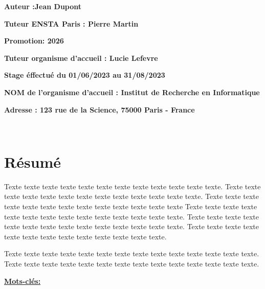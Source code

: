 \documentclass[UTF8,a4paper,12pt]{ctexart}
\def\authorName{Jean Dupont} %
\def\schoolTutor{Pierre Martin} %
\def\classPromotion{2026} %
\def\hostTutor{Lucie Lefevre} %
\def\internshipDuration{Stage éffectué du 01/06/2023 au 31/08/2023} %
\def\hostName{Institut de Recherche en Informatique} %
\def\hostAddress{123 rue de la Science, 75000 Paris - France} %
\begin{document}
\begin{multicols}{2}
    \textbf{\small Auteur :\authorName}\par
    \textbf{\small Tuteur ENSTA Paris : \schoolTutor}\par
    \columnbreak
    \textbf{\small Promotion: \classPromotion}\par
    \textbf{\small Tuteur organisme d'accueil : \hostTutor}\par
\end{multicols}
\par\vspace{1cm}
\textbf{\large\internshipDuration}\par\vspace{1cm}
{\raggedleft
    \textbf{NOM de l'organisme d'accueil : \hostName}\par
    \textbf{Adresse : \hostAddress}\par
}
    
\vspace*{\fill} %

\newpage %
~\newpage
\raggedright
\section*{Résumé}

\hspace{8mm} Texte texte texte texte texte texte texte texte texte texte texte texte. Texte texte texte texte texte texte texte texte texte texte texte texte texte. Texte texte texte texte texte texte texte texte texte texte texte texte texte Texte texte texte texte texte texte texte texte texte texte texte texte texte texte. Texte texte texte texte texte texte texte texte texte texte texte texte texte texte. Texte texte texte texte texte texte texte texte texte texte texte texte texte.

\hspace{8mm} Texte texte texte texte texte texte texte texte texte texte texte texte texte texte. Texte texte texte texte texte texte texte texte texte texte texte texte texte texte.

\vspace{0.3cm}
\textbf{\underline{Mots-clés: }}
\end{document}
